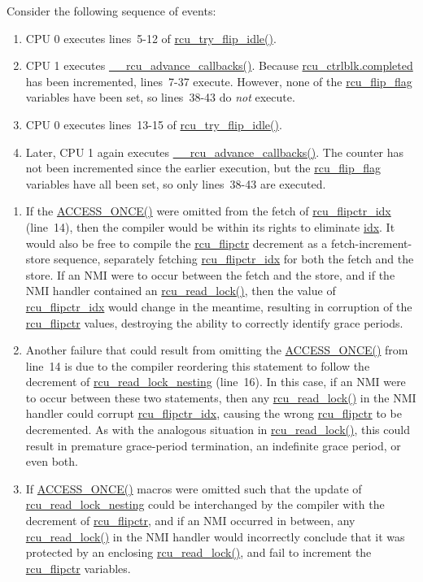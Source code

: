 
Consider the following sequence of events:
\begin{enumerate}
\item	CPU 0 executes lines~5-12 of
	\url{rcu_try_flip_idle()}.
\item	CPU 1 executes \url{__rcu_advance_callbacks()}.
	Because \url{rcu_ctrlblk.completed} has been
	incremented, lines~7-37 execute.
	However, none of the \url{rcu_flip_flag} variables
	have been set, so lines~38-43 do \emph{not} execute.
\item	CPU 0 executes lines~13-15 of
	\url{rcu_try_flip_idle()}.
\item	Later, CPU 1 again executes \url{__rcu_advance_callbacks()}.
	The counter has not been incremented since the earlier
	execution, but the \url{rcu_flip_flag} variables have
	all been set, so only lines~38-43 are executed.
\end{enumerate}


\begin{enumerate}
\item	If the \url{ACCESS_ONCE()} were omitted from the
	fetch of \url{rcu_flipctr_idx} (line~14), then the compiler
	would be within its rights to eliminate \url{idx}.
	It would also be free to compile the \url{rcu_flipctr}
	decrement as a fetch-increment-store sequence, separately fetching
	\url{rcu_flipctr_idx} for both the fetch and the store.
	If an NMI were to occur between the fetch and the store, and
	if the NMI handler contained an \url{rcu_read_lock()},
	then the value of \url{rcu_flipctr_idx} would change
	in the meantime, resulting in corruption of the
	\url{rcu_flipctr} values, destroying the ability
	to correctly identify grace periods.
\item	Another failure that could result from omitting the
	\url{ACCESS_ONCE()} from line~14 is due to
	the compiler reordering this statement to follow the
	decrement of \url{rcu_read_lock_nesting}
	(line~16).
	In this case, if an NMI were to occur between these two
	statements, then any \url{rcu_read_lock()} in the
	NMI handler could corrupt \url{rcu_flipctr_idx},
	causing the wrong \url{rcu_flipctr} to be
	decremented.
	As with the analogous situation in \url{rcu_read_lock()},
	this could result in premature grace-period termination,
	an indefinite grace period, or even both.
\item	If \url{ACCESS_ONCE()} macros were omitted such that
	the update of \url{rcu_read_lock_nesting} could be
	interchanged by the compiler with the decrement of
	\url{rcu_flipctr}, and if an NMI occurred in between,
	any \url{rcu_read_lock()} in the NMI handler would
	incorrectly conclude that it was protected by an enclosing
	\url{rcu_read_lock()}, and fail to increment the
	\url{rcu_flipctr} variables.
\end{enumerate}

